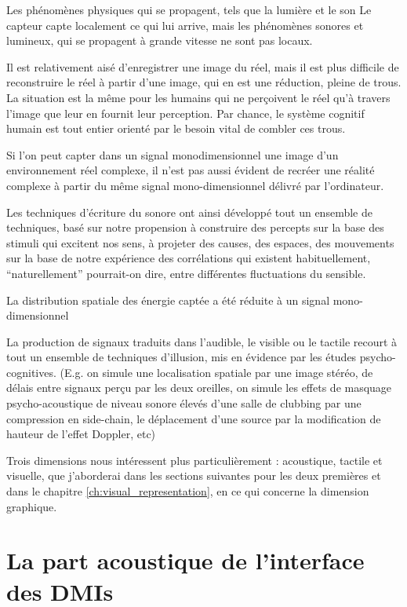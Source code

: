 Les phénomènes physiques qui se propagent, tels que la lumière et le son
Le capteur capte localement ce qui lui arrive, mais les phénomènes sonores et lumineux, qui se propagent à grande vitesse ne sont pas locaux.

Il est relativement aisé d'enregistrer une image du réel, mais il est plus difficile de reconstruire le réel à partir d'une image, qui en est une réduction, pleine de trous. La situation est la même pour les humains qui ne perçoivent le réel qu'à travers l'image que leur en fournit leur perception. Par chance, le système cognitif humain est tout entier orienté par le besoin vital de combler ces trous.


Si l'on peut capter dans un signal monodimensionnel une image d'un environnement réel complexe, il n'est pas aussi évident de recréer une réalité complexe à partir du même signal mono-dimensionnel délivré par l'ordinateur.

Les techniques d'écriture du sonore ont ainsi développé tout un ensemble de techniques, basé sur notre propension à construire des percepts sur la base des stimuli qui excitent nos sens, à projeter des causes, des espaces, des mouvements sur la base de notre expérience des corrélations qui existent habituellement, ``naturellement'' pourrait-on dire, entre différentes fluctuations du sensible.

La distribution spatiale des énergie captée a été réduite à un signal mono-dimensionnel

La production de signaux traduits dans l'audible, le visible ou le tactile recourt à tout un ensemble de techniques d'illusion, mis en évidence par les études psycho-cognitives. (E.g. on simule une localisation spatiale par une image stéréo, de délais entre signaux perçu par les deux oreilles, on simule les effets de masquage psycho-acoustique de niveau sonore élevés d'une salle de clubbing par une compression en side-chain, le déplacement d'une source par la modification de hauteur de l'effet Doppler, etc)

Trois dimensions nous intéressent plus particulièrement : acoustique, tactile et visuelle, que j'aborderai dans les sections suivantes pour les deux premières et dans le chapitre \ref{ch:visual_representation}, en ce qui concerne la dimension graphique.


\section{La part acoustique de l'interface des DMIs}
\label{sec:interfaces:part_acoustique}

